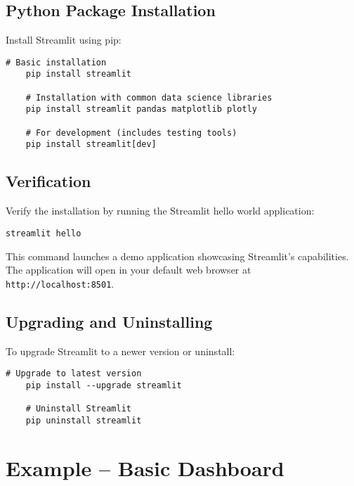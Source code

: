 \subsection{Python Package Installation}
\label{subsec:python_install}

Install Streamlit using pip:

\begin{lstlisting}[style=bashstyle, caption={Streamlit Installation}]
	# Basic installation
	pip install streamlit
	
	# Installation with common data science libraries
	pip install streamlit pandas matplotlib plotly
	
	# For development (includes testing tools)
	pip install streamlit[dev]
\end{lstlisting}

\subsection{Verification}
\label{subsec:verification}

Verify the installation by running the Streamlit hello world application:

\begin{lstlisting}[style=bashstyle, caption={Streamlit Verification}]
	streamlit hello
\end{lstlisting}

This command launches a demo application showcasing Streamlit's capabilities. The application will open in your default web browser at \texttt{http://localhost:8501}.

\subsection{Upgrading and Uninstalling}

To upgrade Streamlit to a newer version or uninstall:

\begin{lstlisting}[style=bashstyle, caption={Streamlit Maintenance}]
	# Upgrade to latest version
	pip install --upgrade streamlit
	
	# Uninstall Streamlit
	pip uninstall streamlit
\end{lstlisting}

\section{Example -- Basic Dashboard}
\label{sec:basic_example}

